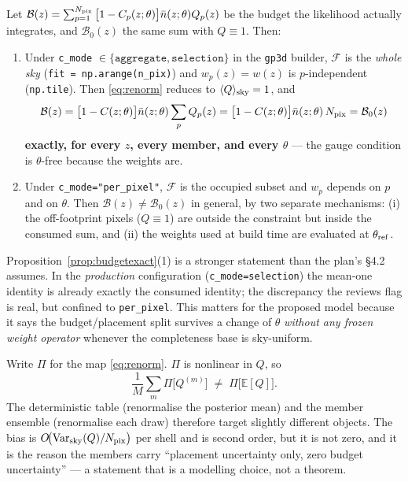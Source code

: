 \begin{proposition}
\label{prop:budgetexact}
Let $\mathcal B(z)=\sum_{p=1}^{N_{\rm pix}}\big[1-C_p(z;\theta)\big]\bar n(z;\theta)Q_p(z)$
be the budget the likelihood actually integrates, and
$\mathcal B_0(z)$ the same sum with $Q\equiv1$.  Then:
\begin{enumerate}
\item Under \verb|c_mode| $\in\{\texttt{aggregate},\texttt{selection}\}$ in the
\texttt{gp3d} builder, $\mathcal F$ is the \emph{whole sky}
(\verb|fit = np.arange(n_pix)|) and $w_p(z)=w(z)$ is $p$-independent
(\verb|np.tile|).  Then \eqref{eq:renorm} reduces to
$\langle Q\rangle_{\rm sky}=1$, and
\begin{equation}
  \mathcal B(z)=\big[1-C(z;\theta)\big]\bar n(z;\theta)\sum_p Q_p(z)
  =\big[1-C(z;\theta)\big]\bar n(z;\theta)\,N_{\rm pix}=\mathcal B_0(z)
\end{equation}
\textbf{exactly, for every $z$, every member, and every $\theta$} --- the
gauge condition is $\theta$-free because the weights are.
\item Under \verb|c_mode="per_pixel"|, $\mathcal F$ is the occupied subset and
$w_p$ depends on $p$ and on $\theta$.  Then $\mathcal B(z)\neq\mathcal B_0(z)$
in general, by two separate mechanisms: (i) the off-footprint pixels
($Q\equiv1$) are outside the constraint but inside the consumed sum, and (ii)
the weights used at build time are evaluated at $\theta_{\rm ref}$.
\end{enumerate}
\end{proposition}

\begin{remark}
Proposition~\ref{prop:budgetexact}(1) is a stronger statement than the plan's
\S4.2 assumes.  In the \emph{production} configuration
(\verb|c_mode=selection|) the mean-one identity is already exactly the consumed
identity; the discrepancy the reviews flag is real, but confined to
\verb|per_pixel|.  This matters for the proposed model because it says the
budget/placement split survives a change of $\theta$ \emph{without any frozen
weight operator} whenever the completeness base is sky-uniform.
\end{remark}

\begin{remark}
\label{rem:noncommute}
Write $\Pi$ for the map \eqref{eq:renorm}.  $\Pi$ is nonlinear in $Q$, so
\begin{equation}
  \frac1M\sum_m \Pi\big[Q^{(m)}\big]\;\neq\;\Pi\big[\mathbb E[Q]\big] .
\end{equation}
The deterministic table (renormalise the posterior mean) and the member
ensemble (renormalise each draw) therefore target slightly different objects.
The bias is $O\!\big(\mathrm{Var}_{\rm sky}(Q)/N_{\rm pix}\big)$ per shell and
is second order, but it is not zero, and it is the reason the members carry
``placement uncertainty only, zero budget uncertainty'' --- a statement that is
a modelling choice, not a theorem.
\end{remark}

